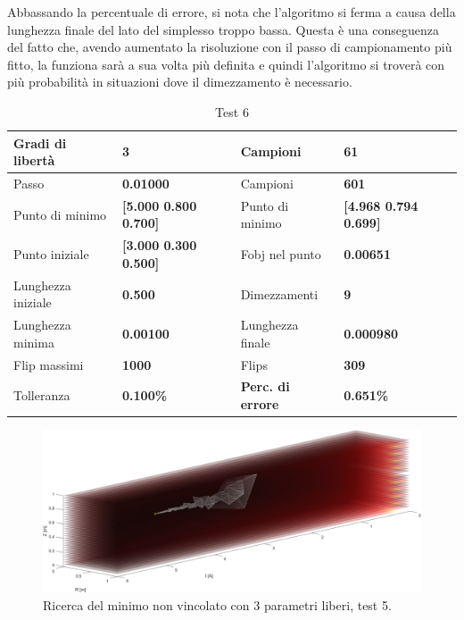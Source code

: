 \documentclass[a4paper, 11pt]{article}
\begin{document}
\noindent
Abbassando la percentuale di errore, si nota che l'algoritmo si ferma a causa
della lunghezza finale del lato del simplesso troppo bassa. Questa è una
conseguenza del fatto che, avendo aumentato la risoluzione con il passo di
campionamento più fitto, la funziona sarà a sua volta più definita e quindi
l'algoritmo si troverà con più probabilità in situazioni dove il dimezzamento è
necessario.

\begin{table}[h] 
    \caption{Test 6}
    \begin{center}
    \begin{tabular}{|l|l|l|l|} 
    \hline 
Gradi di libertà & \textbf{3} & Campioni & \textbf{61} \\ \hline 
Passo & \textbf{0.01000} & Campioni & \textbf{601} \\ \hline 
Punto di minimo & \textbf{{[}5.000 0.800 0.700{]}} & Punto di minimo &
\textbf{{[}4.968 0.794 0.699{]}} \\ \hline 
Punto iniziale & \textbf{{[}3.000 0.300 0.500{]}} & Fobj nel punto &
\textbf{0.00651} \\ \hline 
Lunghezza iniziale & \textbf{0.500} & Dimezzamenti & \textbf{9} \\ \hline 
Lunghezza minima & \textbf{0.00100} & Lunghezza finale & \textbf{0.000980} \\
\hline
Flip massimi & \textbf{1000} & Flips & \textbf{309} \\ \hline 
Tolleranza & \textbf{0.100\%} & \textbf{Perc. di errore} & \textbf{0.651\%} \\
\hline 
    \end{tabular}
    \end{center}
    \end{table}

\begin{figure}[H]
    \centering
        \includegraphics[width=16cm]{assets/figure4}
        \caption{Ricerca del minimo non vincolato con 3 parametri liberi, test 5.}
\end{figure}
\noindent 
\end{document}
